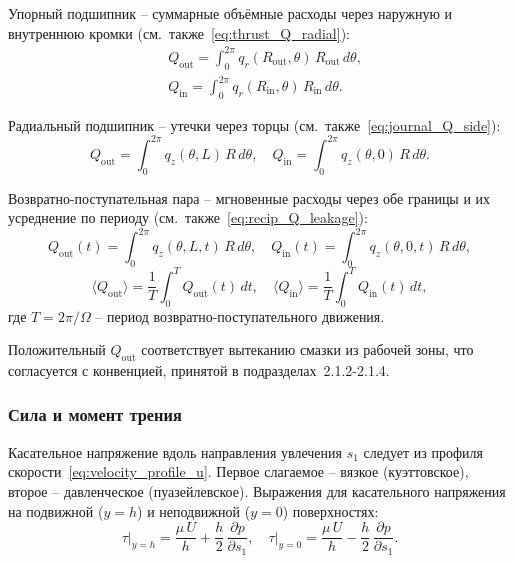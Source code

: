 Упорный подшипник -- суммарные объёмные расходы через наружную
и внутреннюю кромки (см.~также~\eqref{eq:thrust_Q_radial}):
\begin{equation}
\label{eq:func_Q_thrust}
\begin{split}
  &Q_{\mathrm{out}} = \int_0^{2\pi}
    q_r(R_{\mathrm{out}},\theta)\,R_{\mathrm{out}}\,d\theta, \\
  &Q_{\mathrm{in}} = \int_0^{2\pi}
    q_r(R_{\mathrm{in}},\theta)\,R_{\mathrm{in}}\,d\theta.
\end{split}
\end{equation}

Радиальный подшипник -- утечки через торцы
(см.~также~\eqref{eq:journal_Q_side}):
\begin{equation}
  Q_{\mathrm{out}} = \int_0^{2\pi}
    q_z(\theta,L)\,R\,d\theta,
  \quad
  Q_{\mathrm{in}} = \int_0^{2\pi}
    q_z(\theta,0)\,R\,d\theta.
  \label{eq:func_Q_journal}
\end{equation}

Возвратно-поступательная пара -- мгновенные расходы через
обе границы и их усреднение по периоду
(см.~также~\eqref{eq:recip_Q_leakage}):
\begin{equation}
  Q_{\mathrm{out}}(t) = \int_0^{2\pi}
    q_z(\theta,L,t)\,R\,d\theta,
  \quad
  Q_{\mathrm{in}}(t) = \int_0^{2\pi}
    q_z(\theta,0,t)\,R\,d\theta,
  \label{eq:func_Q_recip}
\end{equation}
\begin{equation}
  \langle Q_{\mathrm{out}} \rangle
    = \frac{1}{T}\int_0^T Q_{\mathrm{out}}(t)\,dt,
  \quad
  \langle Q_{\mathrm{in}} \rangle
    = \frac{1}{T}\int_0^T Q_{\mathrm{in}}(t)\,dt,
  \label{eq:func_Q_recip_avg}
\end{equation}
где $T = 2\pi/\Omega$ -- период возвратно-поступательного движения.

Положительный $Q_{\mathrm{out}}$ соответствует вытеканию смазки
из рабочей зоны, что согласуется с конвенцией, принятой
в подразделах~2.1.2-2.1.4.

\subsubsection*{Сила и момент трения}

Касательное напряжение вдоль направления увлечения $s_1$
следует из профиля скорости~\eqref{eq:velocity_profile_u}.
Первое слагаемое -- вязкое (куэттовское), второе -- давленческое
(пуазейлевское).
Выражения для касательного напряжения на подвижной ($y = h$)
и неподвижной ($y = 0$) поверхностях:
\begin{equation}
  \tau\big|_{y=h} = \frac{\mu\,U}{h}
    + \frac{h}{2}\,\frac{\partial p}{\partial s_1},
  \quad
  \tau\big|_{y=0} = \frac{\mu\,U}{h}
    - \frac{h}{2}\,\frac{\partial p}{\partial s_1}.
  \label{eq:func_tau_both}
\end{equation}

